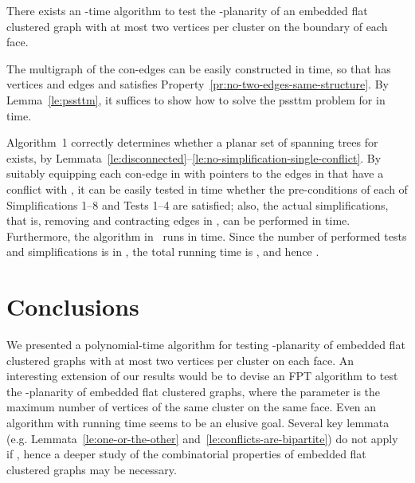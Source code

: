 \documentclass[letter,runningheads]{llncs}
\renewenvironment{proof}
{{\em Proof.\ }}{\hspace*{\fill}\par\vspace{2mm}}
\begin{document}
\begin{theorem} \label{th:main}
There exists an -time algorithm to test the -planarity of an embedded flat clustered graph  with at most two vertices per cluster on the boundary of each face.
\end{theorem}

\begin{proof}
The multigraph  of the con-edges can be easily constructed in  time, so that  has  vertices and edges and satisfies Property~\ref{pr:no-two-edges-same-structure}. By Lemma~\ref{le:pssttm}, it suffices to show how to solve the {\sc pssttm} problem for  in  time.

Algorithm~1 correctly determines whether a planar set  of spanning trees for  exists, by Lemmata~\ref{le:disconnected}--\ref{le:no-simplification-single-conflict}. By suitably equipping each con-edge  in  with pointers to the edges in  that have a conflict with , it can be easily tested in  time whether the pre-conditions of each of {\sc Simplifications 1--8} and {\sc Tests 1--4} are satisfied; also, the actual simplifications, that is, removing and contracting edges in , can be performed in  time. Furthermore, the algorithm in~\cite{df-ectefcgsf-09} runs in  time. Since the number of performed tests and simplifications is in , the total running time is , and hence .
\end{proof}

\section{Conclusions} \label{se:conclusions}

We presented a polynomial-time algorithm for testing -planarity of embedded flat clustered graphs with at most two vertices per cluster on each face. An interesting extension of our results would be to devise an FPT algorithm to test the -planarity of embedded flat clustered graphs, where the parameter is the maximum number  of vertices of the same cluster on the same face. Even an algorithm with running time  seems to be an elusive goal. Several key lemmata (e.g. Lemmata~\ref{le:one-or-the-other} and~\ref{le:conflicts-are-bipartite}) do not apply if , hence a deeper study of the combinatorial properties of embedded flat clustered graphs may be necessary.







\end{document}
